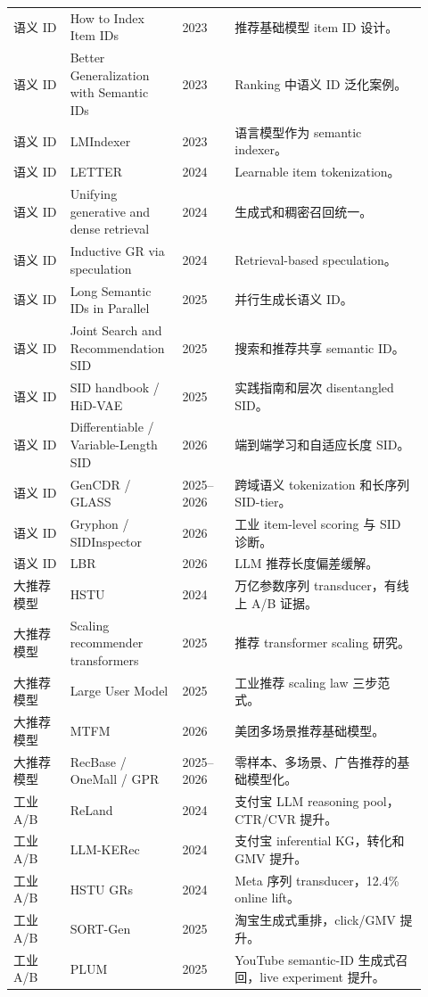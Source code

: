 \documentclass[UTF8,fontset=fandol,11pt]{ctexart}
\begin{document}
\begin{longtable}{@{}p{0.13\linewidth}p{0.23\linewidth}p{0.12\linewidth}p{0.44\linewidth}@{}}
语义 ID & How to Index Item IDs & 2023 & 推荐基础模型 item ID 设计。\\
语义 ID & Better Generalization with Semantic IDs & 2023 & Ranking 中语义 ID 泛化案例。\\
语义 ID & LMIndexer & 2023 & 语言模型作为 semantic indexer。\\
语义 ID & LETTER & 2024 & Learnable item tokenization。\\
语义 ID & Unifying generative and dense retrieval & 2024 & 生成式和稠密召回统一。\\
语义 ID & Inductive GR via speculation & 2024 & Retrieval-based speculation。\\
语义 ID & Long Semantic IDs in Parallel & 2025 & 并行生成长语义 ID。\\
语义 ID & Joint Search and Recommendation SID & 2025 & 搜索和推荐共享 semantic ID。\\
语义 ID & SID handbook / HiD-VAE & 2025 & 实践指南和层次 disentangled SID。\\
语义 ID & Differentiable / Variable-Length SID & 2026 & 端到端学习和自适应长度 SID。\\
语义 ID & GenCDR / GLASS & 2025--2026 & 跨域语义 tokenization 和长序列 SID-tier。\\
语义 ID & Gryphon / SIDInspector & 2026 & 工业 item-level scoring 与 SID 诊断。\\
语义 ID & LBR & 2026 & LLM 推荐长度偏差缓解。\\
大推荐模型 & HSTU & 2024 & 万亿参数序列 transducer，有线上 A/B 证据。\\
大推荐模型 & Scaling recommender transformers & 2025 & 推荐 transformer scaling 研究。\\
大推荐模型 & Large User Model & 2025 & 工业推荐 scaling law 三步范式。\\
大推荐模型 & MTFM & 2026 & 美团多场景推荐基础模型。\\
大推荐模型 & RecBase / OneMall / GPR & 2025--2026 & 零样本、多场景、广告推荐的基础模型化。\\
工业 A/B & ReLand & 2024 & 支付宝 LLM reasoning pool，CTR/CVR 提升。\\
工业 A/B & LLM-KERec & 2024 & 支付宝 inferential KG，转化和 GMV 提升。\\
工业 A/B & HSTU GRs & 2024 & Meta 序列 transducer，12.4\% online lift。\\
工业 A/B & SORT-Gen & 2025 & 淘宝生成式重排，click/GMV 提升。\\
工业 A/B & PLUM & 2025 & YouTube semantic-ID 生成式召回，live experiment 提升。\\

\end{longtable}
\end{document}
